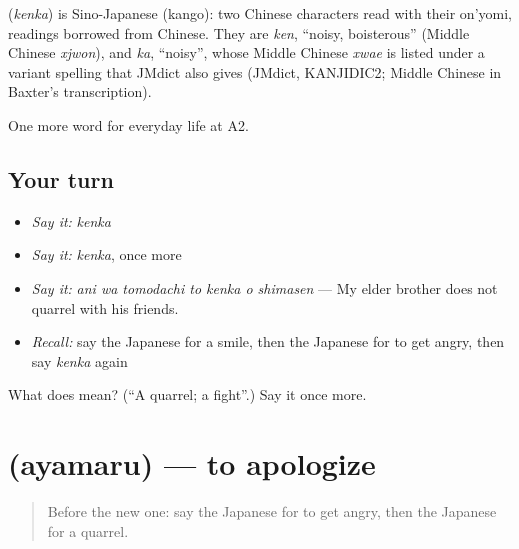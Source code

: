 \begin{cousinweb}
\textbf{} (\emph{kenka}) is Sino-Japanese (kango): two Chinese characters read with their on'yomi, readings borrowed from Chinese. They are \emph{ken}, \textquotedblleft{}noisy, boisterous\textquotedblright{} (Middle Chinese \emph{xjwon}), and \emph{ka}, \textquotedblleft{}noisy\textquotedblright{}, whose Middle Chinese \emph{xwae} is listed under a variant spelling that JMdict also gives (JMdict, KANJIDIC2; Middle Chinese in Baxter's transcription).
\end{cousinweb}

\begin{grammarlens}[title={What you've built}]
One more word for everyday life at A2.
\end{grammarlens}

\subsection*{Your turn}
\begin{itemize}
\raggedright
  \item \emph{Say it:} \emph{kenka}
  \item \emph{Say it:} \emph{kenka}, once more
  \item \emph{Say it:} \emph{ani wa tomodachi to kenka o shimasen} — My elder brother does not quarrel with his friends.
  \item \emph{Recall:} say the Japanese for a smile, then the Japanese for to get angry, then say \emph{kenka} again
\end{itemize}

\begin{tcolorbox}[breakable,colback=teal!4,colframe=teal!35!black,title={Before you move on}]
What does  mean? (\textquotedblleft{}A quarrel; a fight\textquotedblright{}.) Say it once more.
\end{tcolorbox}
\section[\texorpdfstring{\ja{あやまる} (ayamaru)}{あやまる (ayamaru)}]{ (ayamaru) — to apologize}

\label{lesson:JA-C246-ayamaru}



\begin{quote}
Before the new one: say the Japanese for to get angry, then the Japanese for a quarrel.
\end{quote}

